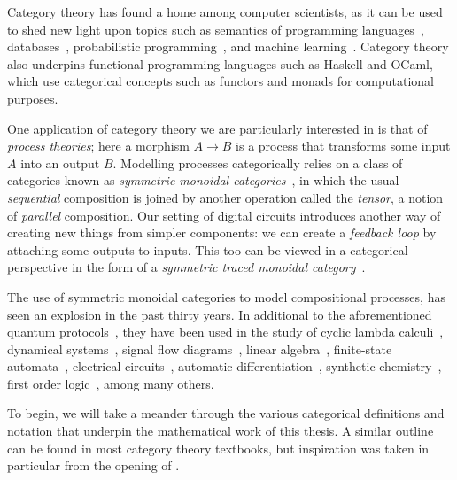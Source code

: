 Category theory has found a home among computer scientists, as
it can be used to shed new light upon topics such as semantics of programming
languages~\cite{oles1982categorytheoretic}, databases~\cite{spivak2012functorial},
probabilistic programming~\cite{cho2019disintegration,fritz2020synthetic}, and
machine learning~\cite{fong2019backprop,cockett2020reverse}.
Category theory also underpins functional programming languages such as
Haskell and OCaml, which use categorical concepts such as functors and monads
for computational purposes.

One application of category theory we are particularly interested in is that of
\emph{process theories}; here a morphism \(A \to B\) is a process that
transforms some input \(A\) into an output \(B\).
Modelling processes categorically relies on a class of categories known as
\emph{symmetric monoidal categories}~\cite{maclane1963natural}, in which the
usual \emph{sequential} composition is joined by another operation called the
\emph{tensor}, a notion of \emph{parallel} composition.
Our setting of digital circuits introduces another way of creating new things
from simpler components: we can create a \emph{feedback loop} by attaching some
outputs to inputs.
This too can be viewed in a categorical perspective in the form of a
\emph{symmetric traced monoidal category}~\cite{joyal1996traced}.

The use of symmetric monoidal categories to model compositional processes, has
seen an explosion in the past thirty years.
In additional to the aforementioned quantum protocols~\cite{coecke2008interacting},
they have been used in the study of cyclic lambda
calculi~\cite{hasegawa1997recursion}, dynamical
systems~\cite{baez2015categories,fong2016categorical}, signal flow
diagrams~\cite{bonchi2014categorical,bonchi2015full,bonchi2017refinement,bonchi2021survey},
linear algebra~\cite{bonchi2017interacting,zanasi2015interacting,bonchi2019graphical,boisseau2022graphical},
finite-state automata~\cite{piedeleu2021string,piedeleu2022finite}, electrical
circuits~\cite{boisseau2022string}, automatic
differentiation~\cite{alvarez-picallo2023functorial}, synthetic
chemistry~\cite{gale2023categorical}, first order
logic~\cite{bonchi2024diagrammatic}, among many others.

To begin, we will take a meander through the various categorical definitions and
notation that underpin the mathematical work of this thesis.
A similar outline can be found in most category theory textbooks, but
inspiration was taken in particular from the opening of
\cite{ghica2023string}.









